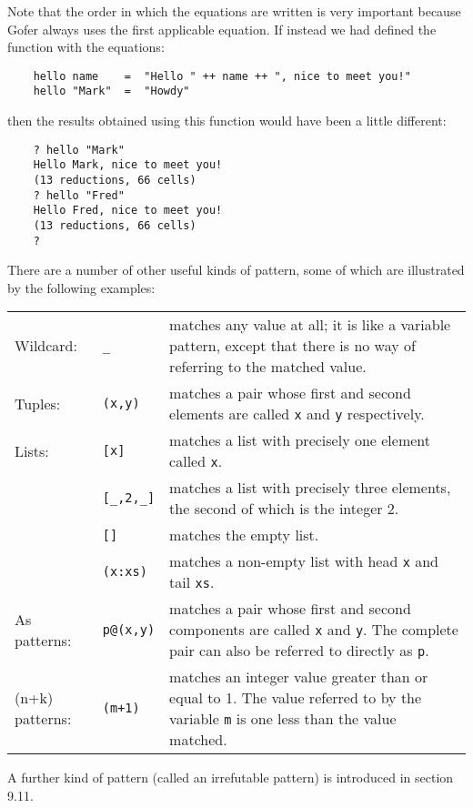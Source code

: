 Note that the  order  in  which  the  equations  are  written  is  very
important because Gofer always uses the first applicable equation.   If
instead we had defined the function with the equations:
\begin{verbatim}
    hello name    =  "Hello " ++ name ++ ", nice to meet you!"
    hello "Mark"  =  "Howdy"
\end{verbatim}
then the results obtained using this function would have been a  little
different:
\begin{verbatim}
    ? hello "Mark"
    Hello Mark, nice to meet you!
    (13 reductions, 66 cells)
    ? hello "Fred"
    Hello Fred, nice to meet you!
    (13 reductions, 66 cells)
    ?
\end{verbatim}
There are a number of other useful kinds of pattern, some of which  are
illustrated by the following examples:
\BQ
\begin{tabular}{llp{8cm}}
  Wildcard: &      \verb"_"  &      matches  any value  at all;  it is like a
                              variable pattern, except that there is no
                              way of referring to the matched value.\\
  Tuples:   &      \verb"(x,y)" &   matches a  pair  whose  first  and second
                              elements are called \verb"x" and \verb"y"
                              respectively.\\
  Lists:    &      \verb"[x]"   &   matches a list with precisely one element
                              called \verb"x".\\
            &      \verb"[_,2,_]"&  matches  a   list  with   precisely three
                              elements,  the  second  of  which  is the
                              integer 2.\\
            &      \verb"[]"   &    matches the empty list.\\
            &      \verb"(x:xs)"&   matches a non-empty  list with 
                                    head \verb"x" and
                                    tail \verb"xs".\\
  As patterns:&    \verb"p@(x,y)"&  matches a  pair  whose  first and  second
                              components  are  called  \verb"x"  
                              and  \verb"y".   The
                              complete pair can  also  be  referred  to
                              directly as \verb"p".\\
  (n+k) patterns:& \verb"(m+1)"  &  matches an integer value  greater than or
                              equal to 1.  The value referred to by the
                              variable \verb"m" is one  less  than  the  value
                              matched.
\end{tabular}
\EQ
A further kind of pattern (called an irrefutable pattern) is introduced
in section 9.11.

